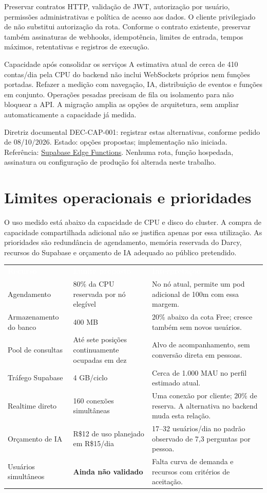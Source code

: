 \documentclass[10pt,a4paper]{article}
\newcommand{\code}[1]{{\ttfamily\footnotesize\detokenize{#1}}}
\newcommand{\smallnote}[1]{\par{\footnotesize\color{NFMuted}#1\par}}
\newcommand{\headcell}[1]{\textcolor{white}{\bfseries #1}}
\newcommand{\pagechapter}[1]{\clearpage\section{#1}}
\begin{document}
Preservar contratos HTTP, validação de JWT, autorização por usuário, permissões administrativas e política de acesso aos dados. O cliente privilegiado de \code{backend/src/supabase_wrapper.ts} não substitui autorização da rota. Conforme o contrato existente, preservar também assinaturas de webhooks, idempotência, limites de entrada, tempos máximos, retentativas e registros de execução.

\begin{NFBox}{Capacidade após consolidar os serviços}
A estimativa atual de cerca de 410 contas/dia pela CPU do backend não inclui WebSockets próprios nem funções portadas. Refazer a medição com navegação, IA, distribuição de eventos e funções em conjunto. Operações pesadas precisam de fila ou isolamento para não bloquear a API. A migração amplia as opções de arquitetura, sem ampliar automaticamente a capacidade já medida.
\end{NFBox}
\smallnote{Diretriz documental DEC-CAP-001: registrar estas alternativas, conforme pedido de 08/10/2026. Estado: opções propostas; implementação não iniciada. Referência: \href{https://supabase.com/docs/guides/functions}{Supabase Edge Functions}. Nenhuma rota, função hospedada, assinatura ou configuração de produção foi alterada neste trabalho.}

\pagechapter{Limites operacionais e prioridades}
O uso medido está abaixo da capacidade de CPU e disco do cluster. A compra de capacidade compartilhada adicional não se justifica apenas por essa utilização. As prioridades são redundância de agendamento, memória reservada do Darcy, recursos do Supabase e orçamento de IA adequado ao público pretendido.

\begingroup\small\renewcommand{\arraystretch}{1.25}
\par\noindent\begin{tabularx}{\linewidth}{@{}L{34mm}L{47mm}Y@{}}
\headcell{Recurso}&\headcell{Limite proposto}&\headcell{Interpretação}\\
Agendamento&80\% da CPU reservada por nó elegível&No nó atual, permite um pod adicional de 100m com essa margem.\\
Armazenamento do banco&400 MB&20\% abaixo da cota Free; cresce também sem novos usuários.\\
Pool de consultas&Até sete posições continuamente ocupadas em dez&Alvo de acompanhamento, sem conversão direta em pessoas.\\
Tráfego Supabase&4 GB/ciclo&Cerca de 1.000 MAU no perfil estimado atual.\\
Realtime direto&160 conexões simultâneas&Uma conexão por cliente; 20\% de reserva. A alternativa no backend muda esta relação.\\
Orçamento de IA&R\$12 de uso planejado em R\$15/dia&17–32 usuários/dia no padrão observado de 7,3 perguntas por pessoa.\\
Usuários simultâneos&\textbf{Ainda não validado}&Falta curva de demanda e recursos com critérios de aceitação.\\
\end{tabularx}\endgroup
\end{document}

